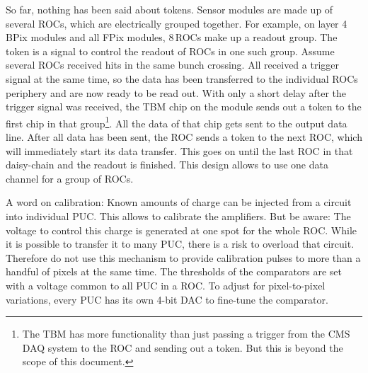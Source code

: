 So far, nothing has been said about tokens. Sensor modules are made up of several \glspl{ROC}, which are electrically grouped together. For example, on layer 4 BPix modules and all FPix modules, 8\,\glspl{ROC} make up a readout group. The token is a signal to control the readout of \glspl{ROC} in one such group. Assume several \glspl{ROC} received hits in the same bunch crossing. All received a trigger signal at the same time, so the data has been transferred to the individual \glspl{ROC} periphery and are now ready to be read out. With only a short delay after the trigger signal was received, the \gls{TBM} chip on the module sends out a token to the first chip in that group\footnote{The \gls{TBM} has more functionality than just passing a trigger from the CMS DAQ system to the \gls{ROC} and sending out a token. But this is beyond the scope of this document.}. All the data of that chip gets sent to the output data line. After all data has been sent, the \gls{ROC} sends a token to the next \gls{ROC}, which will immediately start its data transfer. This goes on until the last \gls{ROC} in that daisy-chain and the readout is finished. This design allows to use one data channel for a group of \glspl{ROC}.

A word on calibration: Known amounts of charge can be injected from a circuit into individual \gls{PUC}. This allows to calibrate the amplifiers. But be aware: The voltage to control this charge is generated at one spot for the whole \gls{ROC}. While it is possible to transfer it to many \gls{PUC}, there is a risk to overload that circuit. Therefore do not use this mechanism to provide calibration pulses to more than a handful of pixels at the same time. The thresholds of the comparators are set with a voltage common to all \gls{PUC} in a \gls{ROC}. To adjust for pixel-to-pixel variations, every \gls{PUC} has its own 4-bit DAC to fine-tune the comparator.

